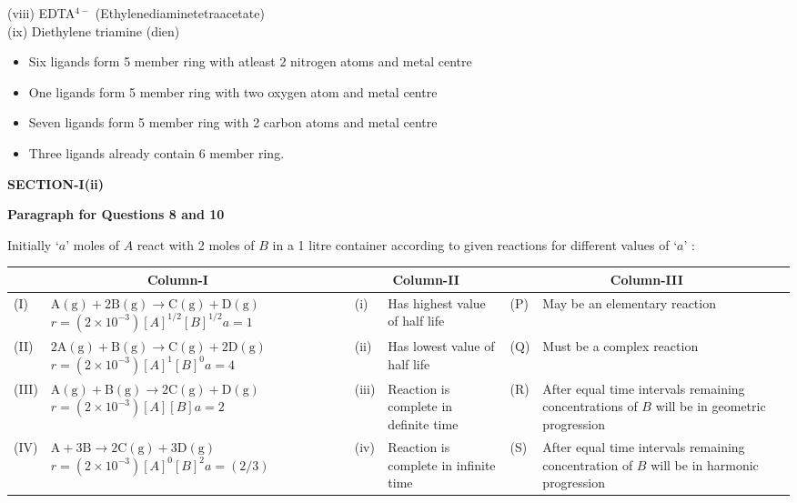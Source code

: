 \documentclass[10pt]{extarticle}
\newcommand{\sect}[1]{\par\smallskip\noindent\textbf{#1}\par}
\newcommand{\paraq}[2]{\par\smallskip\noindent\textbf{Paragraph for Questions #1 and #2}\par}
\newenvironment{qoptions}{\begin{itemize}[leftmargin=1.8em,itemsep=1pt,topsep=2pt,label={}]}{\end{itemize}}
\newcommand{\opt}[2]{\item[(#1)] #2}
\begin{document}
\begin{multicols}{2}
(viii) EDTA$^{4-}$ (Ethylenediaminetetraacetate)\\
(ix) Diethylene triamine (dien)
\begin{qoptions}
\opt{A}{Six ligands form 5 member ring with atleast 2 nitrogen atoms and metal centre}
\opt{B}{One ligands form 5 member ring with two oxygen atom and metal centre}
\opt{C}{Seven ligands form 5 member ring with 2 carbon atoms and metal centre}
\opt{D}{Three ligands already contain 6 member ring.}
\end{qoptions}
\sect{SECTION-I(ii)}
\paraq{8}{10}
Initially `$a$' moles of $A$ react with 2 moles of $B$ in a 1 litre container according to given reactions for different values of `$a$' :
\end{multicols}
\noindent\begin{minipage}{\textwidth}
\footnotesize\setlength{\tabcolsep}{4pt}
\begin{tabular}{|l|p{5.2cm}|l|p{3.2cm}|l|p{4.6cm}|}
\hline
\multicolumn{2}{|c|}{Column-I} & \multicolumn{2}{c|}{Column-II} & \multicolumn{2}{c|}{Column-III}\\
\hline
(I) & $\mathrm{A(g)+2B(g)\to C(g)+D(g)}$\newline $r=(2\times10^{-3})[A]^{1/2}[B]^{1/2}$\newline $a=1$ & (i) & Has highest value of half life & (P) & May be an elementary reaction\\
\hline
(II) & $\mathrm{2A(g)+B(g)\to C(g)+2D(g)}$\newline $r=(2\times10^{-3})[A]^{1}[B]^{0}$\newline $a=4$ & (ii) & Has lowest value of half life & (Q) & Must be a complex reaction\\
\hline
(III) & $\mathrm{A(g)+B(g)\to 2C(g)+D(g)}$\newline $r=(2\times10^{-3})[A][B]$\newline $a=2$ & (iii) & Reaction is complete in definite time & (R) & After equal time intervals remaining concentrations of $B$ will be in geometric progression\\
\hline
(IV) & $\mathrm{A+3B\to 2C(g)+3D(g)}$\newline $r=(2\times10^{-3})[A]^{0}[B]^{2}$\newline $a=(2/3)$ & (iv) & Reaction is complete in infinite time & (S) & After equal time intervals remaining concentration of $B$ will be in harmonic progression\\
\hline
\end{tabular}
\end{minipage}
\end{document}
